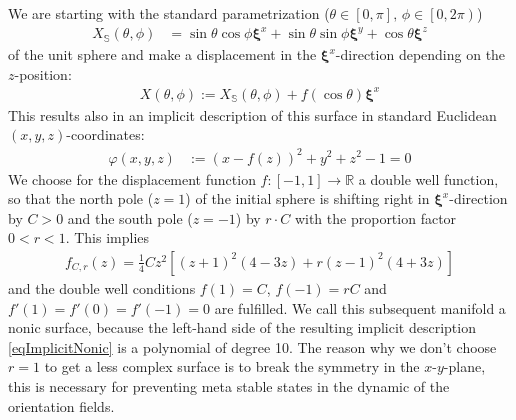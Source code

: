 \documentclass[a4paper,11pt]{scrartcl}
\newcommand{\R}{\mathds{R}}
\newcommand{\base}{\boldsymbol{\xi}}
\begin{document}
    We are starting with the standard parametrization (\(  \theta\in\left[ 0,\pi \right],\, \phi\in\left[ 0,2\pi\right) \))
    \begin{align}
      X_{\mathds{S}}(\theta,\phi) &= 
                      \sin\theta\cos\phi\base^{x} +  \sin\theta\sin\phi \base^{y} + \cos\theta\base^{z}
    \end{align}
    of the unit sphere and make a displacement in the \( \base^{x} \)-direction depending on the \( z \)-position:
    \begin{align}
      X(\theta,\phi) :=  X_{\mathds{S}}(\theta,\phi) + f(\cos\theta)\base^{x}
    \end{align}
    This results also in an implicit description of this surface in standard Euclidean \( (x,y,z) \)-coordinates:
    \begin{align}\label{eqImplicitNonic}
      \varphi(x,y,z) &:= \left( x - f(z) \right)^{2} + y^{2} + z^{2} - 1 = 0
    \end{align}
    We choose for the displacement function \( f:[-1,1]\rightarrow\R \) a double well function, 
    so that the north pole (\( z=1 \)) of the initial sphere is shifting right in  \( \base^{x} \)-direction by \( C>0 \)
    and the south pole (\( z=-1 \)) by \( r\cdot C  \) with the proportion factor \( 0 < r < 1 \).
    This implies
    \begin{align}
      f_{C,r}(z) = \frac{1}{4} C z^2 \left[(z+1)^2 (4-3 z)+r (z-1)^2 (4+3 z)\right]
    \end{align}
    and the double well conditions \( f(1) = C \), \( f(-1)=rC \) and \( f'(1)=f'(0)=f'(-1)=0 \) are fulfilled.
    We call this subsequent manifold a nonic surface, because the left-hand side of the resulting implicit description
    \eqref{eqImplicitNonic} is a polynomial of degree 10.
    The reason why we don't choose \( r = 1 \) to get a less complex surface is to break the symmetry in the 
    \( x \)-\( y \)-plane, this is necessary for preventing meta stable states in the dynamic of the orientation fields.
\end{document}

